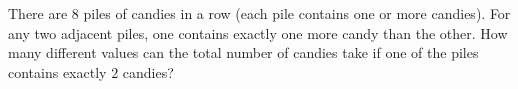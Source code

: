 There are $8$ piles of candies in a row (each pile contains one or more candies). For any two adjacent piles, one contains exactly one more candy than the other. How many different values can the total number of candies take if one of the piles contains exactly $2$ candies?
